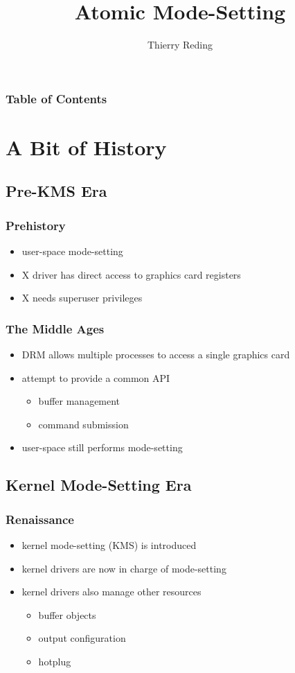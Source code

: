 \documentclass[t]{beamer}
\begin{document}
\title{Atomic Mode-Setting}
\author{Thierry Reding}

\frame{\titlepage}

\begin{frame}
	\frametitle{Table of Contents}
	\tableofcontents
\end{frame}

\section{A Bit of History}

\subsection{Pre-KMS Era}

\begin{frame}
	\frametitle{Prehistory}
	\begin{itemize}
		\item user-space mode-setting
		\item X driver has direct access to graphics card registers
		\item X needs superuser privileges
	\end{itemize}
\end{frame}

\begin{frame}
	\frametitle{The Middle Ages}
	\begin{itemize}
		\item DRM allows multiple processes to access a single graphics card
		\item attempt to provide a common API
			\begin{itemize}
				\item buffer management
				\item command submission
			\end{itemize}
		\item user-space still performs mode-setting
	\end{itemize}
\end{frame}

\subsection{Kernel Mode-Setting Era}

\begin{frame}
	\frametitle{Renaissance}
	\begin{itemize}
		\item kernel mode-setting (KMS) is introduced
		\item kernel drivers are now in charge of mode-setting
		\item kernel drivers also manage other resources
			\begin{itemize}
				\item buffer objects
				\item output configuration
				\item hotplug
			\end{itemize}
	\end{itemize}
\end{frame}
\end{document}
